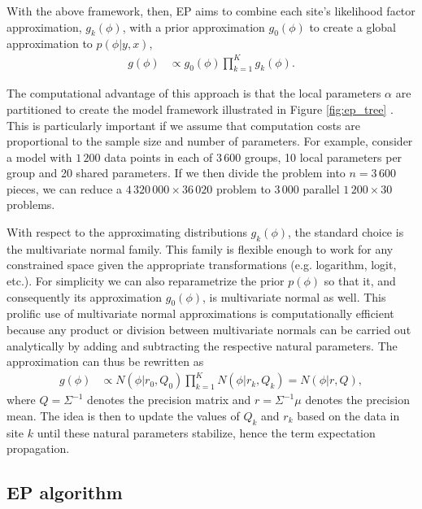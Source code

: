 With the above framework, then, EP aims to combine each site's likelihood factor approximation, $g_k(\phi)$, with a prior approximation $g_0(\phi)$ to create a global approximation to $p(\phi | y, x)$,
\begin{align}
g(\phi) 
&\propto g_0(\phi) \prod_{k=1}^K g_k(\phi).
\end{align}

The computational advantage of this approach is that the local parameters $\alpha$ are partitioned to create the model framework illustrated in Figure \ref{fig:ep_tree} \citep{Gelman+others:2017}. This is particularly important if we assume that computation costs are proportional to the sample size and number of parameters. For example, consider a model with $1\,200$ data points in each of $3\,600$ groups, 10 local parameters per group and 20 shared parameters. If we then divide the problem into $n=3\,600$ pieces, we can reduce a $4\,320\,000 \times 36\,020$ problem to $3\,000$ parallel $1\,200 \times 30$ problems.

With respect to the approximating distributions $g_k(\phi)$, the standard choice is the multivariate normal family. This family is flexible enough to work for any constrained space given the appropriate transformations (e.g. logarithm, logit, etc.). For simplicity we can also reparametrize the prior $p(\phi)$ so that it, and consequently its approximation $g_0(\phi)$, is multivariate normal as well. This prolific use of multivariate normal approximations is computationally efficient because any product or division between multivariate normals can be carried out analytically by adding and subtracting the respective natural parameters. The approximation can thus be rewritten as
\begin{align}
g(\phi)
&\propto N(\phi | r_0, Q_0) \prod_{k=1}^K N(\phi | r_k, Q_k)
= N(\phi | r, Q),
\end{align}
where $Q = \Sigma^{-1}$ denotes the precision matrix and $r = \Sigma^{-1}\mu$ denotes the precision mean. The idea is then to update the values of $Q_k$ and $r_k$ based on the data in site $k$ until these natural parameters stabilize, hence the term expectation propagation.

\subsection{EP algorithm}
\label{subsec:ep_alg}

